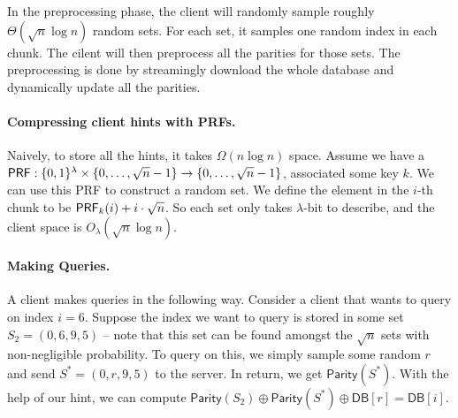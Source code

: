 





In the preprocessing phase,
the client will randomly sample roughly $\Theta(\sqrt{n}\log n)$ random sets.
For each set, it samples one random index in each chunk.
The cilent will then preprocess all the  parities for those sets.
The preprocessing is done by streamingly download the whole database and dynamically update all the parities.

\paragraph{Compressing client hints with PRFs.}
Naively, to store all the hints, it takes $\Omega(n\log n)$ space.
Assume we have a ${\sf PRF}:\{0,1\}^\lambda\times \{0,\dots,\sqrt{n}-1\}\to \{0,\dots,\sqrt{n}-1\}$, associated some key $k$.
We can use this PRF to construct a random set.
We define the element in the $i$-th chunk to be ${\sf PRF}_k(i)+i\cdot\sqrt{n}$.
So each set only takes $\lambda$-bit to describe, and the client space is $O_\lambda(\sqrt{n}\log n)$.

\paragraph{Making Queries.}
A client makes queries in the following way. Consider a client that wants to query on index $i = 6$. Suppose the index we want to query is stored in some set $S_2 = (0, 6, 9, 5)$ -- note that this set can be found amongst the $\sqrt{n}$ sets with non-negligible probability. To query on this, we simply sample some random $r$ and send $S^* = (0, r, 9, 5)$ to the server. In return, we get $\mathsf{Parity}(S^*)$. With the help of our hint, we can compute $\mathsf{Parity}(S_2) \oplus \mathsf{Parity}(S^*) \oplus \mathsf{DB}[r] = \mathsf{DB}[i]$.

